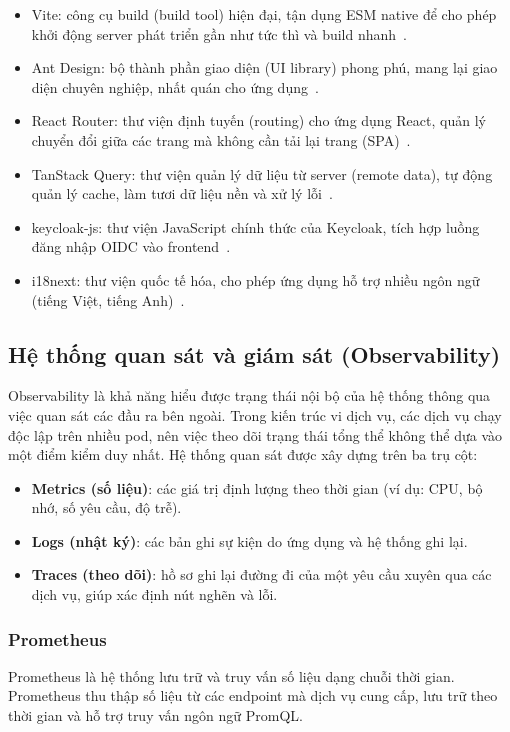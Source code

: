 \documentclass[../BTL.tex]{subfiles}
\begin{document}
\begin{itemize}
    \item Vite: công cụ build (build tool) hiện đại, tận dụng ESM native để cho phép khởi động server phát triển gần như tức thì và build nhanh~\cite{vitedocs}.
    \item Ant Design: bộ thành phần giao diện (UI library) phong phú, mang lại giao diện chuyên nghiệp, nhất quán cho ứng dụng~\cite{antdesigndocs}.
    \item React Router: thư viện định tuyến (routing) cho ứng dụng React, quản lý chuyển đổi giữa các trang mà không cần tải lại trang (SPA)~\cite{reactrouterdocs}.
    \item TanStack Query: thư viện quản lý dữ liệu từ server (remote data), tự động quản lý cache, làm tươi dữ liệu nền và xử lý lỗi~\cite{tanstackquerydocs}.
    \item keycloak-js: thư viện JavaScript chính thức của Keycloak, tích hợp luồng đăng nhập OIDC vào frontend~\cite{keycloakdocs}.
    \item i18next: thư viện quốc tế hóa, cho phép ứng dụng hỗ trợ nhiều ngôn ngữ (tiếng Việt, tiếng Anh)~\cite{i18nextdocs}.
\end{itemize}

\subsection{Hệ thống quan sát và giám sát (Observability)}
\label{section:1.10}

Observability là khả năng hiểu được trạng thái nội bộ của hệ thống thông qua việc quan sát các đầu ra bên ngoài. Trong kiến trúc vi dịch vụ, các dịch vụ chạy độc lập trên nhiều pod, nên việc theo dõi trạng thái tổng thể không thể dựa vào một điểm kiểm duy nhất. Hệ thống quan sát được xây dựng trên ba trụ cột:
\begin{itemize}
    \item \textbf{Metrics (số liệu)}: các giá trị định lượng theo thời gian (ví dụ: CPU, bộ nhớ, số yêu cầu, độ trễ).
    \item \textbf{Logs (nhật ký)}: các bản ghi sự kiện do ứng dụng và hệ thống ghi lại.
    \item \textbf{Traces (theo dõi)}: hồ sơ ghi lại đường đi của một yêu cầu xuyên qua các dịch vụ, giúp xác định nút nghẽn và lỗi.
\end{itemize}

\subsubsection{Prometheus}
Prometheus là hệ thống lưu trữ và truy vấn số liệu dạng chuỗi thời gian. Prometheus thu thập số liệu từ các endpoint mà dịch vụ cung cấp, lưu trữ theo thời gian và hỗ trợ truy vấn ngôn ngữ PromQL.
\end{document}

